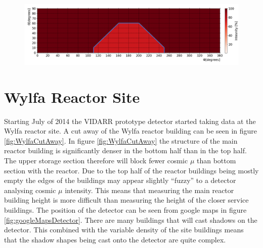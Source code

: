 \documentclass[12pt,a4paper]{article}
\begin{document}
\begin{figure}[H]
 \centering
 \includegraphics[width=1.0\linewidth]{trapazoidHighlightedCubePaper.png}
 \label{fig:trapazoidHighlightedCube}
\end{figure}




\section{Wylfa Reactor Site} \label{sec:wylfaReactorSite}
Starting July of 2014 the VIDARR prototype detector started taking data at the Wylfa reactor site. A cut away of the Wylfa reactor building can be seen in figure \ref{fig:WylfaCutAway}. In figure \ref{fig:WylfaCutAway} the structure of the main reactor building is significantly denser in the bottom half than in the top half. The upper storage section therefore will block fewer cosmic $\mu$ than bottom section with the reactor. Due to the top half of the reactor buildings being mostly empty the edges of the buildings may appear slightly ``fuzzy'' to a detector analysing cosmic $\mu$ intensity. This means that measuring the main reactor building height is more difficult than measuring the height of the closer service buildings. The position of the detector can be seen from google maps in figure \ref{fig:googleMapsDetector}. There are many buildings that will cast shadows on the detector. This combined with the variable density of the site buildings means that the shadow shapes being cast onto the detector are quite complex. 
\end{document}
